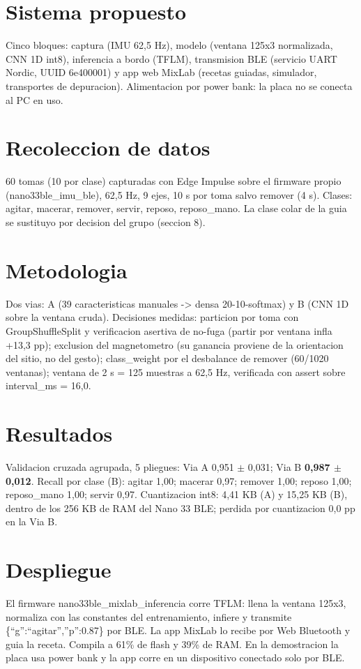 \documentclass[conference]{IEEEtran}
\begin{document}
\section{Sistema propuesto}
Cinco bloques: captura (IMU 62,5 Hz), modelo (ventana 125x3 normalizada, CNN 1D int8), inferencia a bordo (TFLM), transmision BLE (servicio UART Nordic, UUID 6e400001) y app web MixLab (recetas guiadas, simulador, transportes de depuracion). Alimentacion por power bank: la placa no se conecta al PC en uso.

\section{Recoleccion de datos}
60 tomas (10 por clase) capturadas con Edge Impulse sobre el firmware propio (nano33ble\_imu\_ble), 62,5 Hz, 9 ejes, 10 s por toma salvo remover (4 s). Clases: agitar, macerar, remover, servir, reposo, reposo\_mano. La clase colar de la guia se sustituyo por decision del grupo (seccion 8).

\section{Metodologia}
Dos vias: A (39 caracteristicas manuales -> densa 20-10-softmax) y B (CNN 1D sobre la ventana cruda). Decisiones medidas: particion por toma con GroupShuffleSplit y verificacion asertiva de no-fuga (partir por ventana infla +13,3 pp); exclusion del magnetometro (su ganancia proviene de la orientacion del sitio, no del gesto); class\_weight por el desbalance de remover (60/1020 ventanas); ventana de 2 s = 125 muestras a 62,5 Hz, verificada con assert sobre interval\_ms = 16,0.

\section{Resultados}
Validacion cruzada agrupada, 5 pliegues: Via A 0,951 $\pm$ 0,031; Via B \textbf{0,987 $\pm$ 0,012}. Recall por clase (B): agitar 1,00; macerar 0,97; remover 1,00; reposo 1,00; reposo\_mano 1,00; servir 0,97. Cuantizacion int8: 4,41 KB (A) y 15,25 KB (B), dentro de los 256 KB de RAM del Nano 33 BLE; perdida por cuantizacion 0,0 pp en la Via B.

\section{Despliegue}
El firmware nano33ble\_mixlab\_inferencia corre TFLM: llena la ventana 125x3, normaliza con las constantes del entrenamiento, infiere y transmite \{``g'':``agitar'',''p'':0.87\} por BLE. La app MixLab lo recibe por Web Bluetooth y guia la receta. Compila a 61\% de flash y 39\% de RAM. En la demostracion la placa usa power bank y la app corre en un dispositivo conectado solo por BLE.
\end{document}
